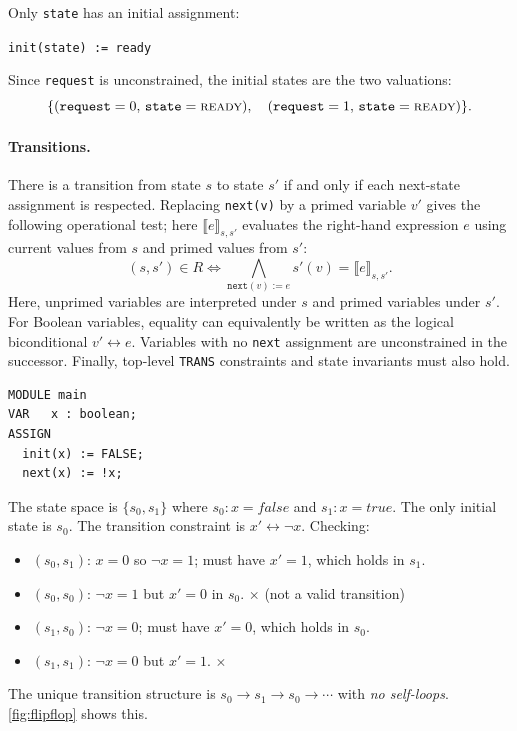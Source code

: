 \begin{example}
Only \texttt{state} has an initial assignment:
\begin{center}
\texttt{init(state) := ready}
\end{center}
Since \texttt{request} is unconstrained, the initial states are the two
valuations:
\[
  \{(\texttt{request}=0,\, \texttt{state}=\textsc{ready}),\quad
    (\texttt{request}=1,\, \texttt{state}=\textsc{ready})\}.
\]
\end{example}

\paragraph{Transitions.}  There is a transition from state $s$ to state
$s'$ if and only if each next-state assignment is respected.  Replacing
\texttt{next(v)} by a primed variable $v'$ gives the following operational
test; here $\llbracket e\rrbracket_{s,s'}$ evaluates the right-hand expression
$e$ using current values from $s$ and primed values from $s'$:
\[
  (s, s') \in R \iff
  \bigwedge_{\texttt{next}(v):=e}
    s'(v)=\llbracket e\rrbracket_{s,s'} .
\]
Here, unprimed variables are interpreted under $s$ and primed variables under
$s'$.  For Boolean variables, equality can equivalently be written as the
logical biconditional $v'\leftrightarrow e$.  Variables with no
\texttt{next} assignment are unconstrained in the successor.  Finally,
top-level \texttt{TRANS} constraints and state invariants must also hold.

\begin{example}
\label{ex:flipflop}
\begin{verbatim}
MODULE main
VAR   x : boolean;
ASSIGN
  init(x) := FALSE;
  next(x) := !x;
\end{verbatim}
The state space is $\{s_0, s_1\}$ where $s_0 : x = \mathit{false}$ and
$s_1 : x = \mathit{true}$.  The only initial state is $s_0$.  The
transition constraint is $x' \leftrightarrow \neg x$.  Checking:
\begin{itemize}
  \item $(s_0, s_1)$: $x=0$ so $\neg x = 1$; must have $x'=1$, which holds
        in $s_1$. \checkmark
  \item $(s_0, s_0)$: $\neg x = 1$ but $x'=0$ in $s_0$. $\times$ (not a
        valid transition)
  \item $(s_1, s_0)$: $\neg x = 0$; must have $x'=0$, which holds in $s_0$.
        \checkmark
  \item $(s_1, s_1)$: $\neg x = 0$ but $x'=1$. $\times$
\end{itemize}
The unique transition structure is $s_0 \to s_1 \to s_0 \to \cdots$
with \emph{no self-loops}.  \cref{fig:flipflop} shows this.
\end{example}

